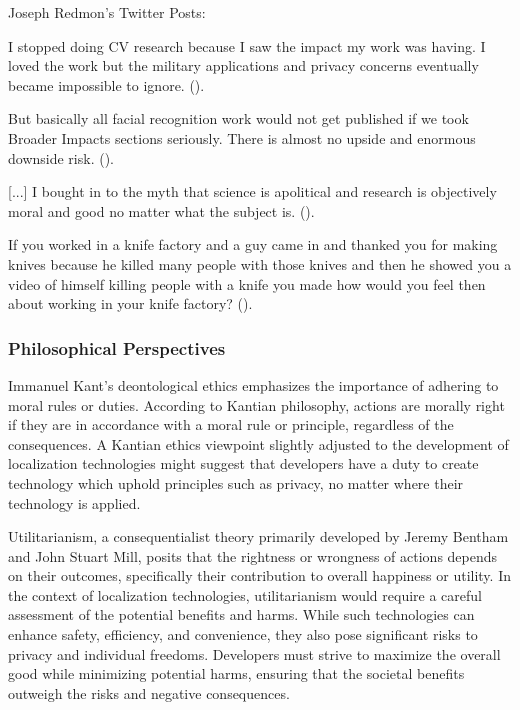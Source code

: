 Joseph Redmon's Twitter Posts:

\begin{myquote}
    I stopped doing CV research because I saw the impact my work was having. I loved the work but the military applications and privacy concerns eventually became impossible to ignore. (\cite{re2020twitter_feb}).

    But basically all facial recognition work would not get published if we took Broader Impacts sections seriously. There is almost no upside and enormous downside risk. (\cite{re2020twitter_feb}).

    [...] I bought in to the myth that science is apolitical and research is objectively moral and good no matter what the subject is. (\cite{re2020twitter_feb}).

    If you worked in a knife factory and a guy came in and thanked you for making knives because he killed many people with those knives and then he showed you a video of himself killing people with a knife you made how would you feel then about working in your knife factory?  (\cite{re2020twitter_june}).
\end{myquote}

\subsubsection{Philosophical Perspectives}
Immanuel Kant's deontological ethics emphasizes the importance of adhering to moral rules or duties. According to Kantian philosophy, actions are morally right if they are in accordance with a moral rule or principle, regardless of the consequences. A Kantian ethics viewpoint slightly adjusted to the development of localization technologies might suggest that developers have a duty to create technology which uphold principles such as privacy, no matter where their technology is applied. 

Utilitarianism, a consequentialist theory primarily developed by Jeremy Bentham and John Stuart Mill, posits that the rightness or wrongness of actions depends on their outcomes, specifically their contribution to overall happiness or utility. In the context of localization technologies, utilitarianism would require a careful assessment of the potential benefits and harms. While such technologies can enhance safety, efficiency, and convenience, they also pose significant risks to privacy and individual freedoms. Developers must strive to maximize the overall good while minimizing potential harms, ensuring that the societal benefits outweigh the risks and negative consequences.

